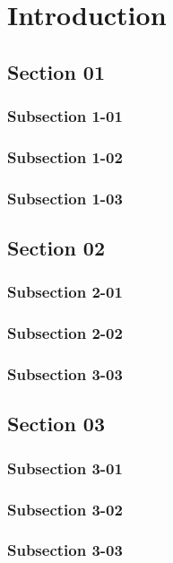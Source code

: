 \chapter{Introduction}

\bt

\section{Section 01}

\subsection{Subsection 1-01}
\bt 
\subsection{Subsection 1-02}
\bt
\subsection{Subsection 1-03}
\bt

\section{Section 02}
\bt
\subsection{Subsection 2-01}
\bt
\subsection{Subsection 2-02}
\bt
\subsection{Subsection 3-03}
\bt

\section{Section 03}
\bt
\subsection{Subsection 3-01}
\bt
\subsection{Subsection 3-02}
\bt
\subsection{Subsection 3-03}
\bt
